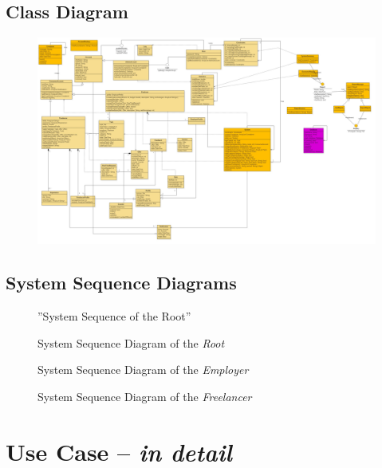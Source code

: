 \documentclass{article}
\begin{document}
\subsection{Class Diagram}
\begin{figure}[ht!]
\centering
\includegraphics[width=128mm]{ClassDiagram_Version1}
\end{figure}





\newpage
\subsection{System Sequence Diagrams}

\begin{figure}[ht!]
\centering
\caption{''System Sequence of the Root''}
\end{figure}

\begin{figure}[ht!]
\centering
\caption{System Sequence Diagram of the \textit{Root}}
\end{figure}

\begin{figure}[ht!]
\centering
\caption{System Sequence Diagram of the \textit{Employer}}
\end{figure}


\begin{figure}[ht!]
\centering
\caption{System Sequence Diagram of the \textit{Freelancer}}
\end{figure}



\newpage
\section{Use Case -- \textit{in detail}}
\end{document}
